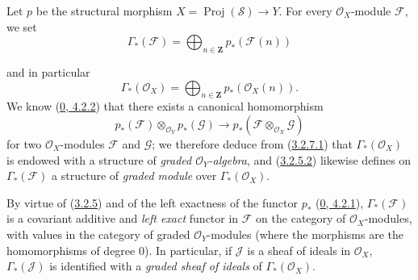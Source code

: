\begin{env}[3.3.1]
\label{II.3.3.1}
Let $p$ be the structural morphism $X=\operatorname{Proj}(\mathcal{S})\to Y$.
For every $\mathcal{O}_X$-module $\mathcal{F}$, we set
\[
\label{II.3.3.1.1}
  \Gamma_*(\mathcal{F})
  =\bigoplus_{n\in\mathbf{Z}}p_*(\mathcal{F}(n))
\tag{3.3.1.1}
\]


and in particular
\[
\label{II.3.3.1.2}
  \Gamma_*(\mathcal{O}_X)
  =\bigoplus_{n\in\mathbf{Z}}p_*(\mathcal{O}_X(n)).
\tag{3.3.1.2}
\]
We know (\hyperref[0.4.2.2]{0, 4.2.2}) that there exists a canonical
homomorphism
\[
  p_*(\mathcal{F})\otimes_{\mathcal{O}_Y}p_*(\mathcal{G})
  \longrightarrow
  p_*(\mathcal{F}\otimes_{\mathcal{O}_X}\mathcal{G})
\]
for two $\mathcal{O}_X$-modules $\mathcal{F}$ and $\mathcal{G}$; we therefore
deduce from (\hyperref[II.3.2.7.1]{3.2.7.1}) that
$\Gamma_*(\mathcal{O}_X)$ is endowed with a structure of
\emph{graded $\mathcal{O}_Y$-algebra}, and
(\hyperref[II.3.2.5.2]{3.2.5.2}) likewise defines on
$\Gamma_*(\mathcal{F})$ a structure of \emph{graded module} over
$\Gamma_*(\mathcal{O}_X)$.

By virtue of (\hyperref[II.3.2.5]{3.2.5}) and of the left exactness of the
functor $p_*$ (\hyperref[0.4.2.1]{0, 4.2.1}),
$\Gamma_*(\mathcal{F})$ is a covariant additive and \emph{left exact}
functor in $\mathcal{F}$ on the category of $\mathcal{O}_X$-modules, with
values in the category of graded $\mathcal{O}_Y$-modules (where the morphisms
are the homomorphisms of degree $0$). In particular, if $\mathcal{J}$ is a
sheaf of ideals in $\mathcal{O}_X$, $\Gamma_*(\mathcal{J})$ is identified
with a \emph{graded sheaf of ideals} of $\Gamma_*(\mathcal{O}_X)$.
\end{env}

